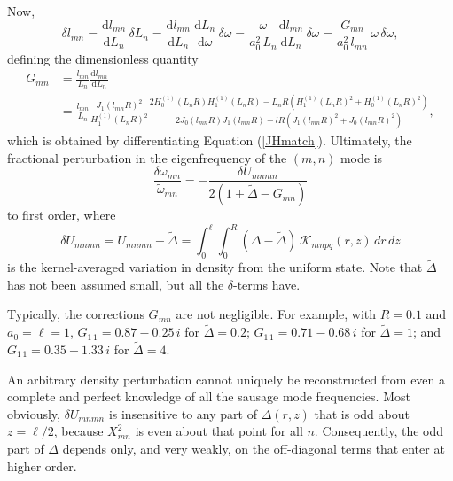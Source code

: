 \documentclass[12pt]{iopart}
\newcommand{\rd}{\mathrm{d}}
\newcommand{\deriv}[2]{\frac{\rd#1}{\rd#2}}
\renewcommand{\L}{{\ell}}
\begin{document}
{
Now, 
\begin{equation}
\delta l_{mn} = \deriv{l_{mn}}{L_n}\,\delta L_n =  \deriv{l_{mn}}{L_n}\,\deriv{L_n}{\omega}\,\delta\omega = \frac{\omega}{a_0^2\,L_n}\deriv{l_{mn}}{L_n}\,\delta\omega = \frac{G_{mn}}{a_0^2\, l_{mn}}\,\omega\,\delta\omega, \label{delta l}
\end{equation}
defining the dimensionless quantity
\begin{equation}
\begin{split}
 G_{mn}&=\frac{l_{mn}}{L_n}\deriv{l_{mn}}{L_n}\\
 & = \frac{l_{mn}}{L_n}
 \frac{J_1(l_{mn}R)^2}{H_1^{(1)}(L_nR)^2}
 \frac{2H_0^{(1)}(L_nR)H_1^{(1)}(L_nR)-L_nR\left(H_1^{(1)}(L_nR)^2+H_0^{(1)}(L_nR)^2 \right)}
 {2J_0(l_{mn}R)J_1(l_{mn}R)-lR\left(J_1(l_{mn}R)^2+J_0(l_{mn}R)^2\right)},
 \end{split}
\end{equation}
which is obtained by differentiating Equation (\ref{JHmatch}). Ultimately, the fractional perturbation in the eigenfrequency of the $(m,n)$ mode is}
\begin{equation}
\frac{\delta\omega_{mn}}{\tilde\omega_{mn}} = -\frac{\delta U_{mnmn}}{2\left(1+\tilde\Delta
-G_{mn}\right)}  \label{delta omega}
\end{equation}
to first order, where
\begin{equation}
\delta U_{mnmn}=U_{mnmn}-\tilde\Delta  = \int_0^\L\!\!\! \int_0^R  \left(\Delta-\tilde\Delta\right)\,\mathcal{K}_{mnpq}(r,z)\,dr\,dz
\end{equation}
is the kernel-averaged variation in density from the uniform state. Note that $\tilde\Delta$ has not been assumed small, but all the $\delta$-terms have.

Typically, the corrections $G_{mn}$ are not negligible. For example, with $R=0.1$ and $a_0=\L=1$, $G_{1\,1}=0.87-0.25\,i$ for $\tilde\Delta=0.2$; $G_{1\,1}=0.71-0.68\,i$ for $\tilde\Delta=1$; and $G_{1\,1}=0.35-1.33\,i$ for $\tilde\Delta=4$.

An arbitrary density perturbation cannot uniquely be reconstructed from even a complete and perfect knowledge of all the sausage mode frequencies. Most obviously, $\delta U_{mnmn}$ is insensitive to any part of $\Delta(r,z)$ that is odd about $z=\L/2$, because $X_{mn}^2$ is even about that point for all $n$. Consequently, the odd part of $\Delta$ depends only, and very weakly, on the off-diagonal terms that enter at higher order.
\end{document}
